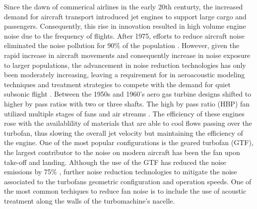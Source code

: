 Since the dawn of commerical airlines in the early 20th centurty, the increased demand for aircraft transport
introduced jet engines to support large cargo and passengers. Consequently,
this rise in innovation resulted in high volume engine noise due to 
the frequency of flights. After 1975, 
efforts to reduce aircraft noise eliminated the noise pollution for 90\% of
the population \cite{FAAPolicy}.  However, given the rapid increase in
aircraft movements and consequently increase in noise exposure to larger 
populations, the advancement in noise reduction 
technologies has only been moderately increasing, leaving a requirement for 
in aeroacoustic modeling techniques and treatment strategies to compete with 
the demand for quiet subsonic flight \cite{icao2020}.  
Between the 1950s and 1960's aero gas turbine designs shifted to higher by pass 
ratios with two or three shafts. The high by pass ratio (HBP) fan utilized multiple
stages of fans and  air streams \cite{smith1989aircraft}. The efficiency of these
engines rose with the availablility of materials that are able to cool flows
passing over the turbofan, thus slowing the overall jet velocity but maintaining the 
efficiency of the engine. One of the most popular configurations is the geared 
turbofan (GTF), the largest contributor to the noise on modern aircraft 
has been the fan upon take-off and landing.  Although the use of the GTF has
reduced the noise emissions by 75\% \cite{GTFinfo}, further noise reduction
technologies to mitigate the noise associated to the turbofans geometric
configuration and operation speeds. One of the most common techiques to reduce 
fan noise  is to include the use of acoustic treatment along the walls of the
turbomachine's nacelle. 

